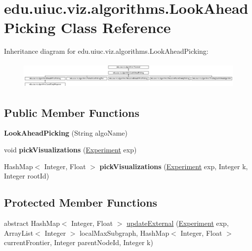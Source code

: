 \hypertarget{classedu_1_1uiuc_1_1viz_1_1algorithms_1_1_look_ahead_picking}{}\section{edu.\+uiuc.\+viz.\+algorithms.\+Look\+Ahead\+Picking Class Reference}
\label{classedu_1_1uiuc_1_1viz_1_1algorithms_1_1_look_ahead_picking}
Inheritance diagram for edu.\+uiuc.\+viz.\+algorithms.\+Look\+Ahead\+Picking\+:\begin{figure}[H]
\begin{center}
\leavevmode
\includegraphics[height=1.370031cm]{classedu_1_1uiuc_1_1viz_1_1algorithms_1_1_look_ahead_picking}
\end{center}
\end{figure}
\subsection*{Public Member Functions}
\begin{DoxyCompactItemize}
\item 
\mbox{\label{classedu_1_1uiuc_1_1viz_1_1algorithms_1_1_look_ahead_picking_aa831b21cd72710b267745d3145ed38aa}} 
{\bfseries Look\+Ahead\+Picking} (String algo\+Name)
\item 
\mbox{\label{classedu_1_1uiuc_1_1viz_1_1algorithms_1_1_look_ahead_picking_ad2e0f12f60eb459fe2c8b47991477a5c}} 
void {\bfseries pick\+Visualizations} (\mbox{\hyperlink{classedu_1_1uiuc_1_1viz_1_1algorithms_1_1_experiment}{Experiment}} exp)
\item 
\mbox{\label{classedu_1_1uiuc_1_1viz_1_1algorithms_1_1_look_ahead_picking_ac0838a359b66ab790af97125184a8433}} 
Hash\+Map$<$ Integer, Float $>$ {\bfseries pick\+Visualizations} (\mbox{\hyperlink{classedu_1_1uiuc_1_1viz_1_1algorithms_1_1_experiment}{Experiment}} exp, Integer k, Integer root\+Id)
\end{DoxyCompactItemize}
\subsection*{Protected Member Functions}
\begin{DoxyCompactItemize}
\item 
abstract Hash\+Map$<$ Integer, Float $>$ \mbox{\hyperlink{classedu_1_1uiuc_1_1viz_1_1algorithms_1_1_look_ahead_picking_a5ba9a735d4038044011f64928225fb1d}{update\+External}} (\mbox{\hyperlink{classedu_1_1uiuc_1_1viz_1_1algorithms_1_1_experiment}{Experiment}} exp, Array\+List$<$ Integer $>$ local\+Max\+Subgraph, Hash\+Map$<$ Integer, Float $>$ current\+Frontier, Integer parent\+Node\+Id, Integer k)
\end{DoxyCompactItemize}
